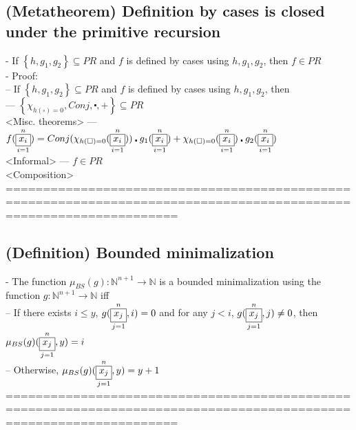 \documentclass{book}
\newcommand{\inot}{\not}
\newcommand{\placeholder}{\square}
\newcommand{\set}[1]{\left\{ #1 \right\}}
\newcommand{\vdc}[3]{\underset{#2}{\overset{#3}{\fbox{$#1$}}}}
\begin{document}
\subsection{(Metatheorem) Definition by cases is closed under the primitive recursion} %
	- If $\set{h, g_1, g_2} \subseteq PR$ and $f$ is defined by cases using $h, g_1, g_2$, then $f \in PR$ \\
	- Proof: \\
		-- If $\set{h, g_1, g_2} \subseteq PR$ and $f$ is defined by cases using $h, g_1, g_2$, then \\
			--- $\set{\chi_{h(\placeholder) = 0}, Conj, \centerdot, +} \subseteq PR$ \\ <Misc. theorems>
			--- $f(\vdc{x_i}{i=1}{n}) = Conj(\chi_{h(\placeholder) = 0}(\vdc{x_i}{i=1}{n})) \centerdot g_1(\vdc{x_i}{i=1}{n}) + \chi_{h(\placeholder) = 0}(\vdc{x_i}{i=1}{n}) \centerdot g_2(\vdc{x_i}{i=1}{n})$ \\ <Informal>
			--- $f \in PR$ \\ <Composition>
	===================================================================================================================
\subsection{(Definition) Bounded minimalization} %
	- The function $\mu_{BS}(g): \mathbb{N}^{n+1} \rightarrow \mathbb{N}$ is a bounded minimalization using the function $g: \mathbb{N}^{n+1} \rightarrow \mathbb{N}$ iff \\
		-- If there exists $i \leq y$, $g(\vdc{x_j}{j=1}{n}, i) = 0$ and for any $j < i$, $g(\vdc{x_j}{j=1}{n}, j) \inot = 0$, then $\mu_{BS}(g)(\vdc{x_j}{j=1}{n}, y) = i$ \\
		-- Otherwise, $\mu_{BS}(g)(\vdc{x_j}{j=1}{n}, y) = y+1$ \\
	===================================================================================================================
\end{document}
